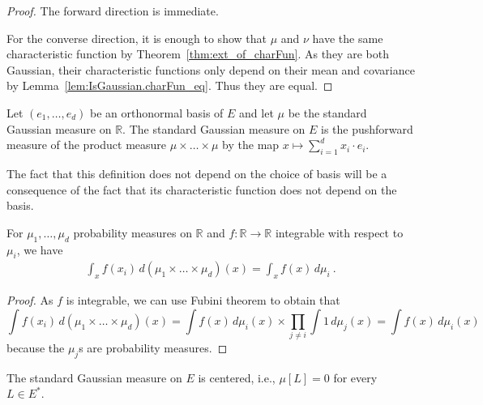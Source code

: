 \begin{proof}\mathlibok
The forward direction is immediate.

For the converse direction, it is enough to show that $\mu$ and $\nu$ have the same characteristic function by Theorem~\ref{thm:ext_of_charFun}. As they are both Gaussian, their characteristic functions only depend on their mean and covariance by Lemma~\ref{lem:IsGaussian.charFun_eq}. Thus they are equal.
\end{proof}


\begin{definition}\label{def:stdGaussian}
  \mathlibok
Let $(e_1, \ldots, e_d)$ be an orthonormal basis of $E$ and let $\mu$ be the standard Gaussian measure on $\mathbb{R}$.
The standard Gaussian measure on $E$ is the pushforward measure of the product measure $\mu \times \ldots \times \mu$ by the map $x \mapsto \sum_{i=1}^d x_i \cdot e_i$.
\end{definition}

The fact that this definition does not depend on the choice of basis will be a consequence of the fact that its characteristic function does not depend on the basis.


\begin{lemma}\label{lem:integral_eval_pi}
  \mathlibok
For $\mu_1, \ldots, \mu_d$ probability measures on $\mathbb{R}$ and $f : \mathbb{R} \to \mathbb{R}$ integrable with respect to $\mu_i$, we have
\begin{align*}
  \int_x f(x_i) \, d(\mu_1 \times \ldots \times \mu_d)(x)
  = \int_x f(x) \, d\mu_i
  \: .
\end{align*}
\end{lemma}

\begin{proof}\leanok
As $f$ is integrable, we can use Fubini theorem to obtain that
$$\int f(x_i) \, d(\mu_1 \times \ldots \times \mu_d)(x) = \int f(x) \, d\mu_i(x) \times \prod_{j \ne i} \int 1 \, d\mu_j(x) = \int f(x) \, d\mu_i(x)$$
because the $\mu_j$s are probability measures.
\end{proof}


\begin{lemma}\label{lem:isCentered_stdGaussian}
  \mathlibok
The standard Gaussian measure on $E$ is centered, i.e., $\mu[L] = 0$ for every $L \in E^*$.
\end{lemma}

